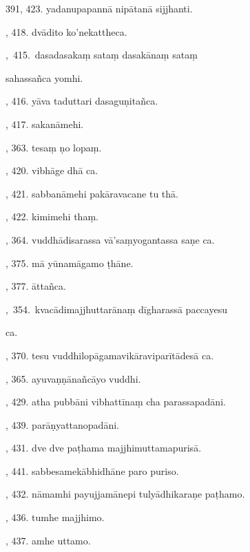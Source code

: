 391, 423. yadanupapannā nipātanā sijjhanti.\hfill \pageref{sut:391}\par {}, 418. dvādito ko’nekattheca.\hfill \pageref{sut:392}\par {},~415.~dasadasakaṃ sataṃ dasakānaṃ sataṃ\par \noindent
\hspace{15mm} sahassañca yomhi.\hfill \pageref{sut:393}\par {}, 416. yāva taduttari dasaguṇitañca.\hfill \pageref{sut:394}\par {}, 417. sakanāmehi.\hfill \pageref{sut:395}\par {}, 363. tesaṃ ṇo lopaṃ.\hfill \pageref{sut:396}\par {}, 420. vibhāge dhā ca.\hfill \pageref{sut:397}\par {}, 421. sabbanāmehi pakāravacane tu thā.\hfill \pageref{sut:398}\par {}, 422. kimimehi thaṃ.\hfill \pageref{sut:399}\par {}, 364. vuddhādisarassa vā’saṃyogantassa saṇe ca.\hfill \pageref{sut:400}\par {}, 375. mā yūnamāgamo ṭhāne.\hfill \pageref{sut:401}\par {}, 377. āttañca.\hfill \pageref{sut:402}\par {},~354.~kvacādimajjhuttarānaṃ dīgharassā paccayesu\par \noindent
\hspace{15mm} ca.\hfill \pageref{sut:403}\par {}, 370. tesu vuddhilopāgamavikāraviparītādesā ca.\hfill \pageref{sut:404}\par {}, 365. ayuvaṇṇānañcāyo vuddhi.\hfill \pageref{sut:405}\par {}, 429. atha pubbāni vibhattīnaṃ cha parassapadāni.\par {}, 439. parāṇyattanopadāni.\par {}, 431. dve dve paṭhama majjhimuttamapurisā.\par {}, 441. sabbesamekābhidhāne paro puriso.\par {}, 432. nāmamhi payujjamānepi tulyādhikaraṇe paṭhamo.\par {}, 436. tumhe majjhimo.\par {}, 437. amhe uttamo.\par \noindent
